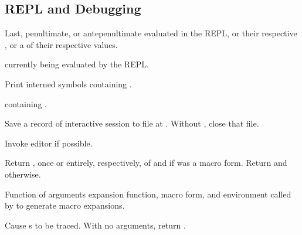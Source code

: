 \subsection[REPL~\&~Debug]{REPL and Debugging} 

\begin{LIST}{1cm}
  
  {
  Last, penultimate, or antepenultimate  evaluated in the REPL, or
  their respective , or a  of their respective
  values. 
  }

  \IT{\V*{--}}
  {
   currently being evaluated by the REPL.
  }

  {
  Print interned symbols containing .
  }

  {
   containing .
  }

  {
  Save a record of interactive session to file at . Without
  , close that file.
  }

  {
  Invoke editor if possible.
  }

  {
  Return , once or entirely, respectively, of
   and \retvalii{\T} if  was a macro form. 
  Return  and \retvalii{\NIL} otherwise.
  }

  {
  Function of arguments expansion function, macro form, and
  environment called by  to generate macro
  expansions. 
  }

  {
  Cause s to be traced. With no arguments,
  return .
  }


\end{LIST}
